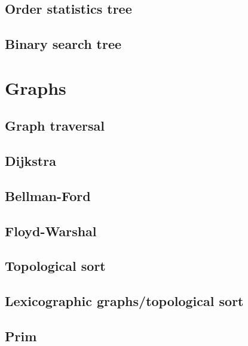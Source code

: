 \subsection{Order statistics tree}
\raggedbottom
\hrulefill
\subsection{Binary search tree}
\raggedbottom
\hrulefill

\section{Graphs}
\subsection{Graph traversal}
\raggedbottom
\hrulefill
\subsection{Dijkstra}
\raggedbottom
\hrulefill
\subsection{Bellman-Ford}
\raggedbottom
\hrulefill
\subsection{Floyd-Warshal}
\raggedbottom
\hrulefill
\subsection{Topological sort}
\raggedbottom
\hrulefill
\subsection{Lexicographic graphs/topological sort}
\raggedbottom
\hrulefill
\subsection{Prim}
\raggedbottom
\hrulefill
